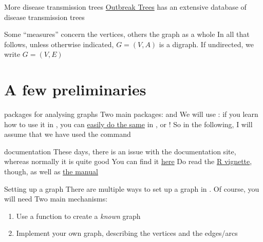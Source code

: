 \documentclass[aspectratio=169]{beamer}\usepackage[]{graphicx}\usepackage[]{xcolor}
\begin{document}
\begin{frame}{More disease transmission trees}
\href{https://outbreaktrees.ecology.uga.edu/}{Outbreak Trees} has an extensive database of disease transmission trees
\end{frame}


\begin{frame}
	Some ``measures'' concern the vertices, others the graph as a whole
	\vfill
	In all that follows, unless otherwise indicated, $G=(V,A)$ is a digraph. If undirected, we write $G=(V,E)$
\end{frame}


\section{A few  preliminaries}


\begin{frame}{ packages for analysing graphs}
	Two main packages: \href{https://cran.r-project.org/web/packages/network/index.html}{} and \href{https://r.igraph.org/}{}
	\vfill
	We will use : if you learn how to use it in , you can \href{https://igraph.org/index.html}{easily do the same} in ,  or  !
	\vfill
	So in the following, I will assume that we have used the command 
\end{frame}

\begin{frame}{ documentation}
	These days, there is an issue with the  documentation site, whereas normally it is quite good
	\vfill
	You can find it \href{https://igraph.org/r/doc/}{here}
	\vfill
	Do read the \href{https://cran.r-project.org/web/packages/igraph/vignettes/igraph.html}{R vignette}, though, as well as \href{https://cran.r-project.org/web/packages/igraph/igraph.pdf}{the manual}
\end{frame}

\begin{frame}{Setting up a graph}
	There are multiple ways to set up a graph in . Of course, you will need 
	\vfill
	Two main mechanisms:
	\begin{enumerate}
		\item Use a function to create a \emph{known} graph 
		\item Implement your own graph, describing the vertices and the edges/arcs
	\end{enumerate}
\end{frame}
\end{document}
